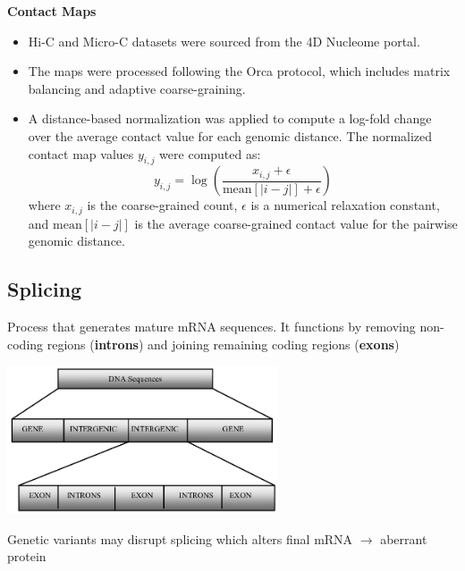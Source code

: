 \documentclass[../main.tex]{subfiles}
\begin{document}
\textbf{Contact Maps}

\begin{itemize}
    \item Hi-C and Micro-C datasets were sourced from the 4D Nucleome portal.
    \item The maps were processed following the Orca protocol, which includes matrix balancing and adaptive coarse-graining.
    \item A distance-based normalization was applied to compute a log-fold change over the average contact value for each genomic distance. The normalized contact map values $y_{i,j}$ were computed as:
    \begin{equation}
        y_{i,j} = \log\left(\frac{x_{i,j} + \epsilon}{\text{mean}[|i-j|] + \epsilon}\right)
    \end{equation}
    where $x_{i,j}$ is the coarse-grained count, $\epsilon$ is a numerical relaxation constant, and $\text{mean}[|i-j|]$ is the average coarse-grained contact value for the pairwise genomic distance.
\end{itemize}






\vspace{0.3cm}

\subsection{Splicing}

Process that generates mature mRNA sequences. It functions by removing non-coding regions (\textbf{introns}) and joining remaining coding regions  (\textbf{exons}) 

\vspace{0.3cm}

\begin{center}
    \includegraphics[width=8cm]{files/images/dna_intronexon.png}    
\end{center}

Genetic variants may disrupt splicing which alters final mRNA $\rightarrow$ aberrant protein 
\end{document}
